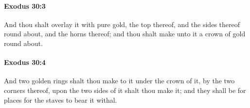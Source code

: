 		\paragraph{Exodus 30:3} %
			\label{EXODUS-30-3}

			And thou shalt overlay it with pure gold, the top thereof, and the sides thereof round about, and the horns thereof; and thou shalt make unto it a crown of gold round about.


		\paragraph{Exodus 30:4} %
			\label{EXODUS-30-4}

			And two golden rings shalt thou make to it under the crown of it, by the two corners thereof, upon the two sides of it shalt thou make it; and they shall be for places for the staves to bear it withal.


